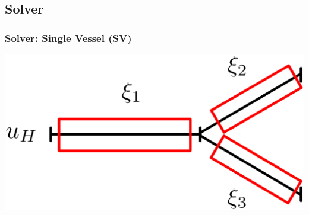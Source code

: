 \documentclass[compress]{beamer}
\begin{document}
\subsection{Solver}

\begin{frame}
	\frametitle{Solver: Single Vessel (SV)}
	\includegraphics[width=\linewidth]{images/bifurcation_vessels.eps}
\end{frame}
\end{document}
